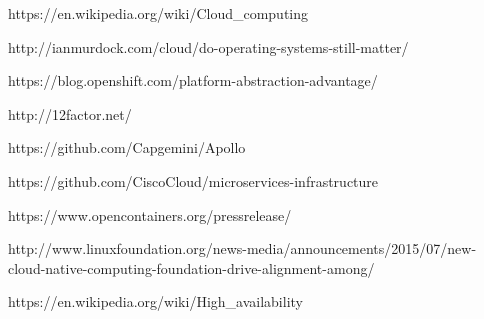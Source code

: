 \begin{thebibliography}{999}

%
%

https://en.wikipedia.org/wiki/Cloud\_computing

%
%

http://ianmurdock.com/cloud/do-operating-systems-still-matter/

https://blog.openshift.com/platform-abstraction-advantage/

http://12factor.net/

https://github.com/Capgemini/Apollo

https://github.com/CiscoCloud/microservices-infrastructure

%
%

https://www.opencontainers.org/pressrelease/

%
%

http://www.linuxfoundation.org/news-media/announcements/2015/07/new-cloud-native-computing-foundation-drive-alignment-among/

%
%

%
%


%
%

https://en.wikipedia.org/wiki/High\_availability

\end{thebibliography}